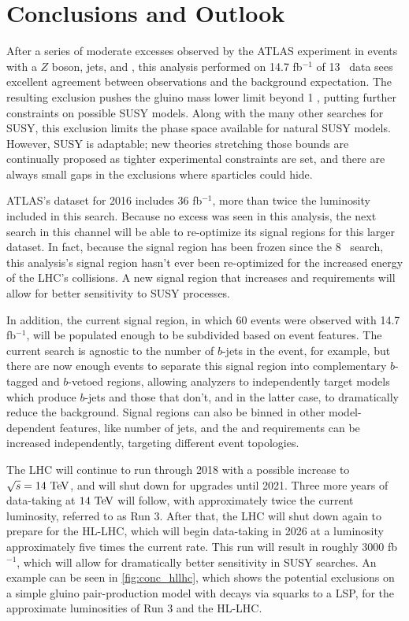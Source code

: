 
\chapter{Conclusions and Outlook} %
\label{ch:conc} 

After a series of moderate excesses observed by the \ac{ATLAS} experiment in events with a $Z$ boson, jets, and \met, this analysis performed on 14.7 fb$^{-1}$ of 13 \tev~data sees excellent agreement between observations and the background expectation. The resulting exclusion pushes the gluino mass lower limit beyond 1 \tev, putting further constraints on possible \ac{SUSY} models. Along with the many other searches for \ac{SUSY}, this exclusion limits the phase space available for natural \ac{SUSY} models. However, \ac{SUSY} is adaptable; new theories stretching those bounds are continually proposed as tighter experimental constraints are set, and there are always small gaps in the exclusions where sparticles could hide. 

\ac{ATLAS}'s dataset for 2016 includes 36 fb$^{-1}$, more than twice the luminosity included in this search. Because no excess was seen in this analysis, the next search in this channel will be able to re-optimize its signal regions for this larger dataset. In fact, because the signal region has been frozen since the 8 \tev~search, this analysis's signal region hasn't ever been re-optimized for the increased energy of the \ac{LHC}'s collisions. A new signal region that increases \met and \HT requirements will allow for better sensitivity to \ac{SUSY} processes. 

In addition, the current signal region, in which 60 events were observed with 14.7 fb$^{-1}$, will be populated enough to be subdivided based on event features. The current search is agnostic to the number of $b$-jets in the event, for example, but there are now enough events to separate this signal region into complementary $b$-tagged and $b$-vetoed regions, allowing analyzers to independently target models which produce $b$-jets and those that don't, and in the latter case, to dramatically reduce the \ttbar background. Signal regions can also be binned in other model-dependent features, like number of jets, and the \met and \HT requirements can be increased independently, targeting different event topologies. 

The \ac{LHC} will continue to run through 2018 with a possible increase to $\sqrt{s} = 14\tev$, and will shut down for upgrades until 2021. Three more years of data-taking at $14\tev$ will follow, with approximately twice the current luminosity, referred to as Run 3. After that, the \ac{LHC} will shut down again to prepare for the \ac{HL-LHC}, which will begin data-taking in 2026 at a luminosity approximately five times the current rate. This run will result in roughly 3000 fb$^{-1}$, which will allow for dramatically better sensitivity in \ac{SUSY} searches. An example can be seen in \autoref{fig:conc_hllhc}, which shows the potential exclusions on a simple gluino pair-production model with decays via squarks to a \ac{LSP}, for the approximate luminosities of Run 3 and the \ac{HL-LHC}. 


